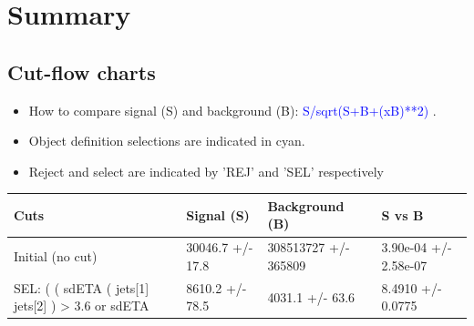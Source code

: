 \documentclass[a4paper, 10pt]{article}
\begin{document}
\section{ Summary}

\subsection{Cut-flow charts}

\begin{itemize}
  \item How to compare signal (S) and background (B): \textcolor{blue}{S/\-sqrt(S+B+(xB)**2)} .
   \item Object definition selections are indicated in cyan.  \item Reject and select are indicated by 'REJ' and 'SEL' respectively
\end{itemize}
\begin{table}[H]
  \begin{center}
    \begin{tabular}{|m{36.0mm}|m{36.0mm}|m{36.0mm}|m{33.0mm}|}
      \hline
      {\cellcolor{yellow}        Cuts}& {\cellcolor{yellow}         Signal (S)}& {\cellcolor{yellow}         Background (B)}& {\cellcolor{yellow}         S vs B}\\
      \hline
      {\cellcolor{white}         Initial (no cut)}& {\cellcolor{white}         30046.7 +/\-- 17.8}& {\cellcolor{white}         308513727 +/\-- 365809}& {\cellcolor{white}         3.90e-04 +/\-- 2.58e-07}\\
      \hline
      {\cellcolor{white} SEL: ( ( sdETA ( jets[1] jets[2] ) > 3.6 or sdETA }& {\cellcolor{white}         8610.2 +/\-- 78.5}& {\cellcolor{white}         4031.1 +/\-- 63.6}& {\cellcolor{white}         8.4910 +/\-- 0.0775}\\
\hline
    \end{tabular}
  \end{center}
\end{table}
\end{document}
